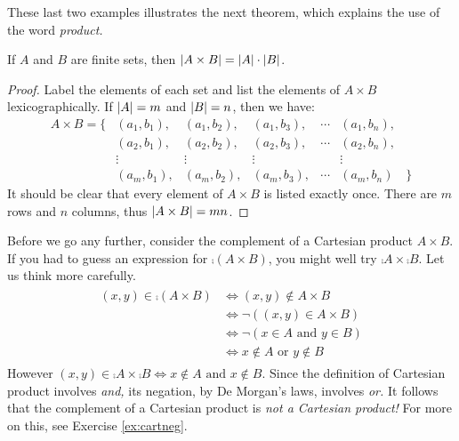 These last two examples illustrates the next theorem, which explains the use of the word \emph{product.}

\begin{thm}{}{}
	If $A$ and $B$ are finite sets, then $\left| A\times B\right|=\left| A\right|\cdot\left| B\right|$.
\end{thm}

\begin{proof}
	Label the elements of each set and list the elements of $A\times B$ lexicographically. If $\left| A\right|=m$ and $\left| B\right|=n$, then we have:
	\[
		\begin{array}{rccccccl}
			A\times B=\big\{&(a_1,b_1),&(a_1,b_2),&(a_1,b_3),&\cdots&(a_1,b_n),&\\
			&(a_2,b_1),&(a_2,b_2),&(a_2,b_3),&\cdots&(a_2,b_n),&\\
			&\vdots&\vdots&\vdots&&\vdots&\\
			&(a_m,b_1),&(a_m,b_2),&(a_m,b_3),&\cdots&(a_m,b_n)&\big\}
		\end{array}
	\]
	It should be clear that every element of $A\times B$ is listed exactly once. There are $m$ rows and $n$ columns, thus $\left| A\times B\right|=mn$.
\end{proof}

Before we go any further, consider the complement of a Cartesian product $A\times B$. If you had to guess an expression for $\comp{(A\times B)}$, you might well try $\comp A\times\comp B$. Let us think more carefully.
\begin{gather*}
	\begin{aligned}
		(x,y)\in\comp{(A\times B)}&\iff (x,y)\not\in A\times B\\
		&\iff \neg((x,y)\in A\times B)\\
		&\iff \neg(x\in A\text{ and }y\in B)\\
		&\iff x\not\in A\text{ or }y\not\in B
	\end{aligned}
\end{gather*}
However $(x,y)\in\comp A\times\comp B\iff x\not\in A\text{ and }x\not\in B$. Since the definition of Cartesian product involves \emph{and,} its negation, by De Morgan's laws, involves \emph{or.} It follows that the complement of a Cartesian product is \emph{not a Cartesian product!} For more on this, see Exercise \ref{ex:cartneg}.\par


